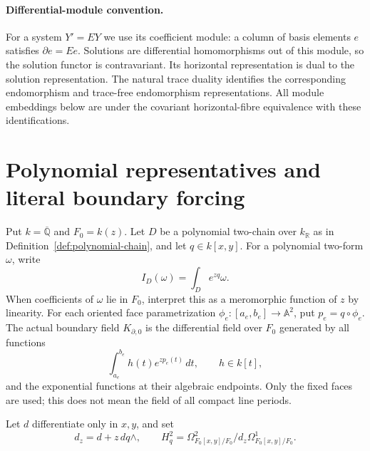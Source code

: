 \documentclass[11pt]{article}
\numberwithin{equation}{section}
\theoremstyle{definition}
\theoremstyle{remark}
\newcommand{\Q}{\mathbb Q}
\newcommand{\R}{\mathbb R}
\newcommand{\dd}{\,d}
\newcommand{\Hq}{H_q^2}
\newcommand{\A}{\mathbb A}
\begin{document}
\paragraph{Differential-module convention.}
For a system $Y'=EY$ we use its coefficient module: a column of basis
elements $e$ satisfies $\partial e=Ee$. Solutions are differential
homomorphisms out of this module, so the solution functor is contravariant.
Its horizontal representation is dual to the solution representation.
The natural trace duality identifies the corresponding endomorphism and
trace-free endomorphism representations. All module embeddings below are
under the covariant horizontal-fibre equivalence with these identifications.

\section{Polynomial representatives and literal boundary forcing}\label{sec:boundary-construction}
Put $k=\overline{\Q}$ and $F_0=k(z)$.  Let $D$ be a polynomial
two-chain over $k_\R$ as in Definition~\ref{def:polynomial-chain}, and
let $q\in k[x,y]$. For a polynomial two-form
$\omega$, write
\[
 I_D(\omega)=\int_D e^{zq}\omega.
\]
When coefficients of $\omega$ lie in $F_0$, interpret this as a meromorphic
function of $z$ by linearity. For each oriented face parametrization
$\phi_e:[a_e,b_e]\to\A^2$, put $p_e=q\circ\phi_e$.
The actual boundary field $K_{\partial,0}$ is the differential field over
$F_0$ generated by all functions
\[
 \int_{a_e}^{b_e} h(t)e^{zp_e(t)}\dd t,\qquad h\in k[t],
\]
and the exponential functions at their algebraic endpoints. Only the fixed
faces are used; this does not mean the field of all compact line periods.

Let $d$ differentiate only in $x,y$, and set
\[
 d_z=d+z\,dq\wedge,\qquad
 \Hq=\Omega^2_{F_0[x,y]/F_0}/d_z\Omega^1_{F_0[x,y]/F_0}.
\]
\end{document}
